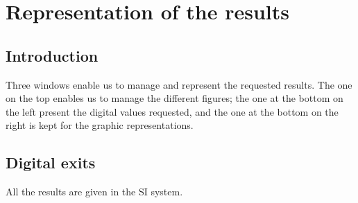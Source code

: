 \chapter{Representation of the results}\label{chap6}

\minitoc

\section{Introduction}

Three windows enable us to manage and represent the requested results.
The one on the top enables us to manage the different figures; the one
at the bottom on the left present the digital values requested, and
the one at the bottom on the right is kept for the graphic
representations.

\section{Digital exits}

All the results are given in the SI system. 

